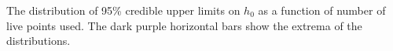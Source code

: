 \label{fig:uls}
The distribution of 95\% credible upper limits on $h_0$ as a function of number of live points
used. The dark purple horizontal bars show the extrema of the distributions.
